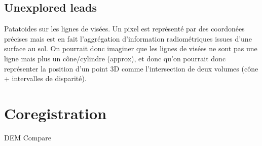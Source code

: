 \subsection{Unexplored leads}
Patatoides sur les lignes de visées. Un pixel est représenté par des coordonées précises mais est en fait l'aggrégation d'information radiométriques issues d'une surface au sol. On pourrait donc imaginer que les lignes de visées ne sont pas une ligne mais plus un cône/cylindre (approx), et donc qu'on pourrait donc représenter la position d'un point 3D comme l'intersection de deux volumes (cône + intervalles de disparité).   

\section{Coregistration}
DEM Compare 
\pagebreak
\blankpage